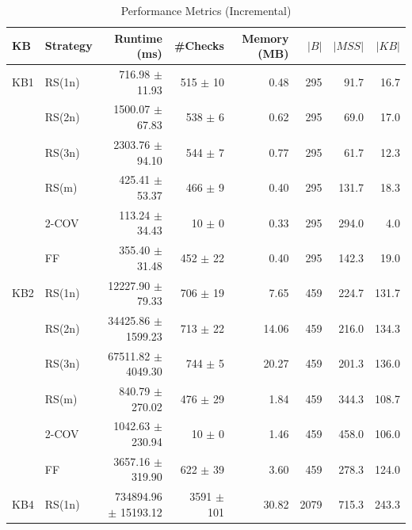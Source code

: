 \begin{table}[htbp]
\centering
\caption{Performance Metrics (Incremental)}
\label{tab:performance_incremental}
\begin{tabular}{llrrrrrr}
\toprule
KB & Strategy & Runtime (ms) & \#Checks & Memory (MB) & $|B|$ & $|MSS|$ & $|KB|$ \\
\midrule
KB1 & RS(1n) & 716.98 $\pm$ 11.93 & 515 $\pm$ 10 & 0.48 & 295 & 91.7 & 16.7 \\
 & RS(2n) & 1500.07 $\pm$ 67.83 & 538 $\pm$ 6 & 0.62 & 295 & 69.0 & 17.0 \\
 & RS(3n) & 2303.76 $\pm$ 94.10 & 544 $\pm$ 7 & 0.77 & 295 & 61.7 & 12.3 \\
 & RS(m) & 425.41 $\pm$ 53.37 & 466 $\pm$ 9 & 0.40 & 295 & 131.7 & 18.3 \\
 & 2-COV & 113.24 $\pm$ 34.43 & 10 $\pm$ 0 & 0.33 & 295 & 294.0 & 4.0 \\
 & FF & 355.40 $\pm$ 31.48 & 452 $\pm$ 22 & 0.40 & 295 & 142.3 & 19.0 \\
\midrule
KB2 & RS(1n) & 12227.90 $\pm$ 79.33 & 706 $\pm$ 19 & 7.65 & 459 & 224.7 & 131.7 \\
 & RS(2n) & 34425.86 $\pm$ 1599.23 & 713 $\pm$ 22 & 14.06 & 459 & 216.0 & 134.3 \\
 & RS(3n) & 67511.82 $\pm$ 4049.30 & 744 $\pm$ 5 & 20.27 & 459 & 201.3 & 136.0 \\
 & RS(m) & 840.79 $\pm$ 270.02 & 476 $\pm$ 29 & 1.84 & 459 & 344.3 & 108.7 \\
 & 2-COV & 1042.63 $\pm$ 230.94 & 10 $\pm$ 0 & 1.46 & 459 & 458.0 & 106.0 \\
 & FF & 3657.16 $\pm$ 319.90 & 622 $\pm$ 39 & 3.60 & 459 & 278.3 & 124.0 \\
\midrule
KB4 & RS(1n) & 734894.96 $\pm$ 15193.12 & 3591 $\pm$ 101 & 30.82 & 2079 & 715.3 & 243.3 \\
\bottomrule
\end{tabular}
\end{table}

